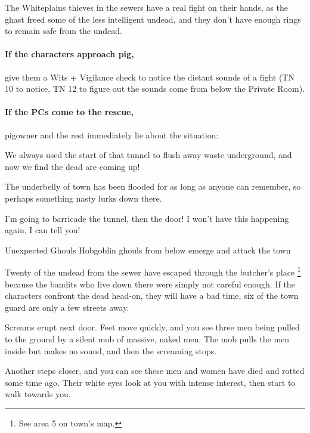 \begin{multicols}{2}
The Whiteplains thieves in the sewers have a real fight on their hands, as the ghast freed some of the less intelligent undead, and they don't have enough rings to remain safe from the undead.

\paragraph{If the characters approach \gls{pig},}
give them a Wits + Vigilance check  to notice the distant sounds of a fight (TN 10 to notice, TN 12 to figure out the sounds come from below the Private Room).

\paragraph{If the PCs come to the rescue,}
\gls{pigowner} and the rest immediately lie about the situation:

\begin{speechtext}
  We always used the start of that tunnel to flush away waste underground, and now we find the dead are coming up!

  The underbelly of \gls{town} has been flooded for as long as anyone can remember, so perhaps something nasty lurks down there.

  I'm going to barricade the tunnel, then the door!
  I won't have this happening again, I can tell you!
\end{speechtext}

{\N\N Unexpected Ghouls}%
{Hobgoblin ghouls from below emerge and attack the town}%

Twenty of the undead from the sewer have escaped through the butcher's place%
\footnote{See area 5 on \gls{town}'s map.}
because the bandits who live down there were simply not careful enough.
If the characters confront the dead head-on, they will have a bad time, six of the town guard are only a few streets away.

\begin{boxtext}

  Screams erupt next door.
  Feet move quickly, and you see three men being pulled to the ground by a silent mob of massive, naked men.
  The mob pulls the men inside but makes no sound, and then the screaming stops.

  Another steps closer, and you can see these men and women have died and rotted some time ago.
  Their white eyes look at you with intense interest, then start to walk towards you.


\end{boxtext}
\end{multicols}

